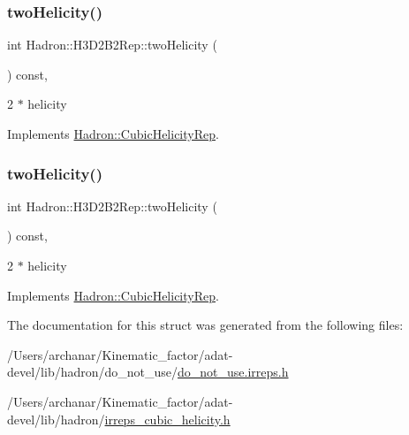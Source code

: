\subsubsection{\texorpdfstring{twoHelicity()}{twoHelicity()}\hspace{0.1cm}{\footnotesize\ttfamily [2/3]}}
{\footnotesize\ttfamily int Hadron\+::\+H3\+D2\+B2\+Rep\+::two\+Helicity (\begin{DoxyParamCaption}{ }\end{DoxyParamCaption}) const\hspace{0.3cm}{\ttfamily [inline]}, {\ttfamily [virtual]}}

2 $\ast$ helicity 

Implements \mbox{\hyperlink{structHadron_1_1CubicHelicityRep_af507aa56fc2747eacc8cb6c96db31ecc}{Hadron\+::\+Cubic\+Helicity\+Rep}}.

\mbox{\label{structHadron_1_1H3D2B2Rep_ad64aabbb6d77c697acb2c327018ecfea}} 
\subsubsection{\texorpdfstring{twoHelicity()}{twoHelicity()}\hspace{0.1cm}{\footnotesize\ttfamily [3/3]}}
{\footnotesize\ttfamily int Hadron\+::\+H3\+D2\+B2\+Rep\+::two\+Helicity (\begin{DoxyParamCaption}{ }\end{DoxyParamCaption}) const\hspace{0.3cm}{\ttfamily [inline]}, {\ttfamily [virtual]}}

2 $\ast$ helicity 

Implements \mbox{\hyperlink{structHadron_1_1CubicHelicityRep_af507aa56fc2747eacc8cb6c96db31ecc}{Hadron\+::\+Cubic\+Helicity\+Rep}}.



The documentation for this struct was generated from the following files\+:\begin{DoxyCompactItemize}
\item 
/\+Users/archanar/\+Kinematic\+\_\+factor/adat-\/devel/lib/hadron/do\+\_\+not\+\_\+use/\mbox{\hyperlink{adat-devel_2lib_2hadron_2do__not__use_2do__not__use_8irreps_8h}{do\+\_\+not\+\_\+use.\+irreps.\+h}}\item 
/\+Users/archanar/\+Kinematic\+\_\+factor/adat-\/devel/lib/hadron/\mbox{\hyperlink{adat-devel_2lib_2hadron_2irreps__cubic__helicity_8h}{irreps\+\_\+cubic\+\_\+helicity.\+h}}\end{DoxyCompactItemize}
